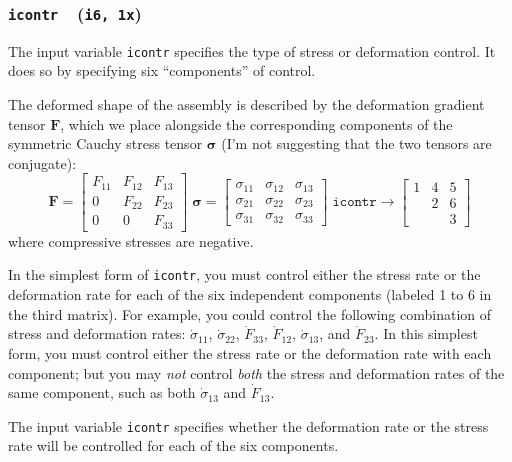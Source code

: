 \documentclass[letterpaper,11pt]{article}
\newcommand{\Var}[2]{\texttt{#1}\ \  (\texttt{#2})}
\begin{document}
\subsubsection[\texttt{icontr}]{\Var{icontr}{i6, 1x}}\label{sec:icontr}
The input variable \texttt{icontr} specifies the type of stress
or deformation control.
It does so by specifying six ``components'' of control.
\par
The deformed shape of the assembly is described by the 
deformation gradient tensor
$\mathbf{F}$, which we place alongside the
corresponding components of the symmetric Cauchy stress tensor
$\mathbf{\sigma}$ (I'm not suggesting that the two tensors are conjugate):
\begin{equation}
\mathbf{F} = \left[
\begin{array}{ccc}
F_{11} & F_{12} & F_{13} \\
  0    & F_{22} & F_{23} \\
  0    &   0    & F_{33}
\end{array}
\right]
\;
\mathbf{\sigma} = \left[
\begin{array}{ccc}
\sigma_{11} & \sigma_{12} & \sigma_{13} \\
\sigma_{21} & \sigma_{22} & \sigma_{23} \\
\sigma_{31} & \sigma_{32} & \sigma_{33} 
\end{array}
\right]
\;
\mathtt{icontr} \rightarrow \left[
\begin{array}{ccc}
1 & 4 & 5 \\
  & 2 & 6 \\
  &   & 3
\end{array}
\right]
\end{equation}
where compressive stresses are negative.
\par
In the simplest form of \texttt{icontr},
you must control either the stress rate or the deformation rate
for each of the six independent components
(labeled 1 to 6 in the third matrix).
For example, you could control the following combination
of stress and deformation rates:
$\dot{\sigma}_{11}$, $\dot{\sigma}_{22}$,
$\dot{F}_{33}$, $\dot{F}_{12}$,
$\dot{\sigma}_{13}$, and $\dot{F}_{23}$.
In this simplest form,
you must control either the stress rate or the deformation rate with each
component; but
you may \emph{not} control \emph{both} the stress and deformation rates
of the same component, such as both $\dot{\sigma}_{13}$ and $\dot{F}_{13}$.
\par
The input variable \texttt{icontr} specifies whether the deformation rate or
the stress rate will be controlled for each of the six components.
\end{document}

